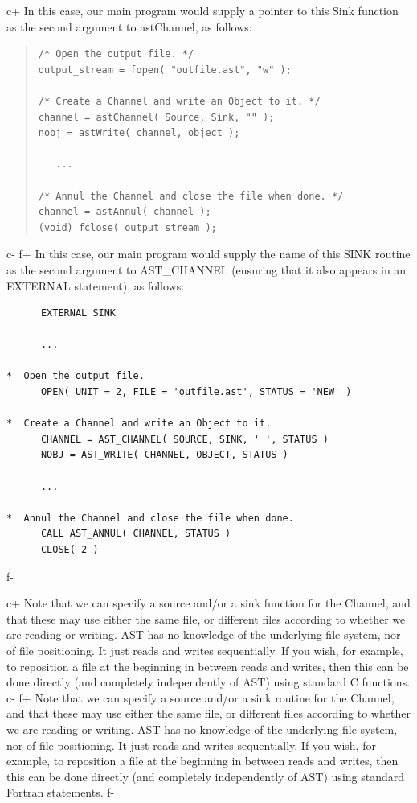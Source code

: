 \documentclass[twoside,11pt]{article}
\begin{document}
c+
In this case, our main program would supply a pointer to this Sink
function as the second argument to astChannel, as follows:

\begin{quote}
\small
\begin{verbatim}
/* Open the output file. */
output_stream = fopen( "outfile.ast", "w" );

/* Create a Channel and write an Object to it. */
channel = astChannel( Source, Sink, "" );
nobj = astWrite( channel, object );

   ...

/* Annul the Channel and close the file when done. */
channel = astAnnul( channel );
(void) fclose( output_stream );
\end{verbatim}
\normalsize
\end{quote}
c-
f+
In this case, our main program would supply the name of this SINK
routine as the second argument to AST\_CHANNEL (ensuring that it also
appears in an EXTERNAL statement), as follows:

\small
\begin{verbatim}
      EXTERNAL SINK

      ...

*  Open the output file.
      OPEN( UNIT = 2, FILE = 'outfile.ast', STATUS = 'NEW' )

*  Create a Channel and write an Object to it.
      CHANNEL = AST_CHANNEL( SOURCE, SINK, ' ', STATUS )
      NOBJ = AST_WRITE( CHANNEL, OBJECT, STATUS )

      ...

*  Annul the Channel and close the file when done.
      CALL AST_ANNUL( CHANNEL, STATUS )
      CLOSE( 2 )
\end{verbatim}
\normalsize
f-

c+
Note that we can specify a source and/or a sink function for the
Channel, and that these may use either the same file, or different
files according to whether we are reading or writing. AST has no
knowledge of the underlying file system, nor of file positioning. It
just reads and writes sequentially. If you wish, for example, to
reposition a file at the beginning in between reads and writes, then
this can be done directly (and completely independently of AST) using
standard C functions.
c-
f+
Note that we can specify a source and/or a sink routine for the
Channel, and that these may use either the same file, or different
files according to whether we are reading or writing. AST has no
knowledge of the underlying file system, nor of file positioning. It
just reads and writes sequentially. If you wish, for example, to
reposition a file at the beginning in between reads and writes, then
this can be done directly (and completely independently of AST) using
standard Fortran statements.
f-
\end{document}
